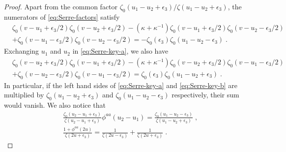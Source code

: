 \documentclass[11pt]{article}
\numberwithin{equation}{section}
\numberwithin{figure}{section}
\numberwithin{table}{section}
\begin{document}
\begin{proof}
	Apart from the common factor $\zeta_0(u_1-u_2+\epsilon_3)/\zeta(u_1-u_2+\epsilon_3)$, the numerators of \eqref{eq:Serre-factors} satisfy
	\begin{align}
		&\zeta_0(v-u_1+\epsilon_3/2)\zeta_0(v-u_2+\epsilon_3/2)-\left(\kappa+\kappa^{-1}\right)\zeta_0(v-u_1+\epsilon_3/2)\zeta_0(v-u_2-\epsilon_3/2)\nonumber\\
		&+\zeta_0(v-u_1-\epsilon_3/2)\zeta_0(v-u_2-\epsilon_3/2)=-\zeta_0(\epsilon_3)\zeta_0(u_1-u_2-\epsilon_3)\;.\label{eq:Serre-key-a}
	\end{align}
    Exchanging $u_1$ and $u_2$ in \eqref{eq:Serre-key-a}, we also have
	\begin{align}
		&\zeta_0(v-u_2+\epsilon_3/2)\zeta_0(v-u_1+\epsilon_3/2)-\left(\kappa+\kappa^{-1}\right)\zeta_0(v-u_2+\epsilon_3/2)\zeta_0(v-u_1-\epsilon_3/2)\nonumber\\
		&+\zeta_0(v-u_2-\epsilon_3/2)\zeta_0(v-u_1-\epsilon_3/2)=\zeta_0(\epsilon_3)\zeta_0(u_1-u_2+\epsilon_3)\;.\label{eq:Serre-key-b}
	\end{align}
	In particular, if the left hand sides of \eqref{eq:Serre-key-a} and \eqref{eq:Serre-key-b} are multiplied by $\zeta_0(u_1-u_2+\epsilon_3)$ and $\zeta_0(u_1-u_2-\epsilon_3)$ respectively, their sum would vanish. We also notice that
	\begin{subequations}
		\begin{align}
			&\frac{\zeta_0(u_2-u_1+\epsilon_3)}{\zeta(u_2-u_1+\epsilon_3)}\phi^{aa}(u_2-u_1)=\frac{\zeta_0(u_1-u_2-\epsilon_3)}{\zeta(u_1-u_2+\epsilon_3)}\;,\label{eq:Serre-kappa}\\
			&\frac{1+\phi^{aa}(2u)}{\zeta(2u+\epsilon_3)}=\frac{1}{\zeta(2u-\epsilon_3)}+\frac{1}{\zeta(2u+\epsilon_3)}\;.\label{eq:Serre-g}
		\end{align}
	\end{subequations}


\end{proof}
\end{document}
